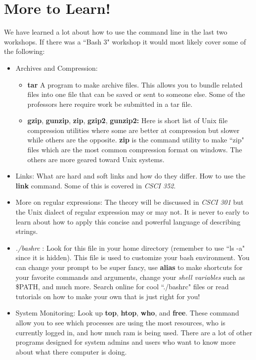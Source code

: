 \documentclass[oneside]{book}
\begin{document}
\chapter{More to Learn!}
We have learned a lot about how to use the command line in the last two workshops. If there was a ``Bash 3" workshop it would most likely cover some of the following:
\begin{itemize}
        \item Archives and Compression:
            \begin{itemize}
                \item{\textbf{tar}} A program to make archive files. This allows you to bundle related files into one file that can be saved or sent to someone else. Some of the professors here require work be submitted in a tar file.
                \item{\textbf{gzip}, \textbf{gunzip}, \textbf{zip}, \textbf{gzip2}, \textbf{gunzip2:}} Here is short list of Unix file compression utilities where some are better at compression but slower while others are the opposite. \textbf{zip} is the command utility to make ``zip" files which are the most common compression format on windows. The others are more geared toward Unix systems.
            \end{itemize}
            
        \item Links: What are hard and soft links and how do they differ. How to use the \textbf{link} command. Some of this is covered in \textit{CSCI 352}.
        \item More on regular expressions: The theory will be discussed in \textit{CSCI 301} but the Unix dialect of regular expression may or may not. It is never to early to learn about how to apply this concise and powerful language of describing strings.
        \item{\textit{./bashrc} :} Look for this file in your home directory (remember to use ``ls -a" since it is hidden). This file is used to customize your bash environment. You can change your prompt to be super fancy, use \textbf{alias} to make shortcuts for your favorite commands and arguments, change your \textit{shell variables} such as \$PATH, and much more. Search online for cool ``./bashrc" files or read tutorials on how to make your own that is just right for you!
        \item{System Monitoring:} Look up \textbf{top}, \textbf{htop}, \textbf{who}, and \textbf{free}. These command allow you to see which processes are using the most resources, who is currently logged in, and how much ram is being used. There are a lot of other programs designed for system admins and users who want to know more about what there computer is doing.
\end{itemize}
\end{document}
